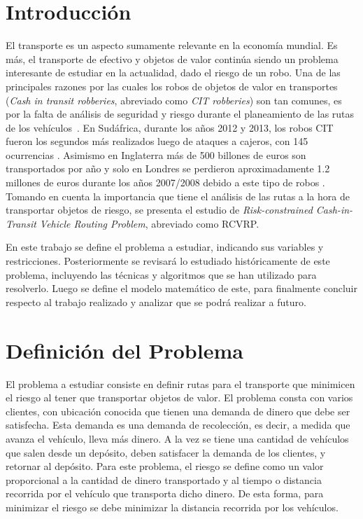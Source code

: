 \documentclass[letter, 10pt]{article}
\begin{document}
\section{Introducci\'on}
El transporte es un aspecto sumamente relevante en la economía mundial. Es más, el transporte de efectivo y objetos de valor continúa siendo un problema interesante de estudiar en la actualidad, dado el riesgo de un robo. Una de las principales razones por las cuales los robos de objetos de valor en transportes (\textit{Cash in transit robberies}, abreviado como \textit{CIT robberies}) son tan comunes, es por la falta de análisis de seguridad y riesgo durante el planeamiento de las rutas de los vehículos~\cite{hepenstal2010concentration}. En Sudáfrica, durante los años 2012 y 2013, los robos CIT fueron los segundos más realizados luego de ataques a cajeros, con 145 ocurrencias \cite{thobane2014criminal}. Asimismo en Inglaterra más de 500 billones de euros son transportados por año \cite{talarico2015metaheuristics} y solo en Londres se perdieron aproximadamente 1.2 millones de euros durante los años 2007/2008 debido a este tipo de robos \cite{hepenstal2010concentration}. Tomando en cuenta la importancia que tiene el análisis de las rutas a la hora de transportar objetos de riesgo, se presenta el estudio de \textit{Risk-constrained Cash-in-Transit Vehicle Routing Problem}, abreviado como RCVRP. 

En este trabajo se define el problema a estudiar, indicando sus variables y restricciones. Posteriormente se revisará lo estudiado históricamente de este problema, incluyendo las técnicas y algoritmos que se han utilizado para resolverlo. Luego se define el modelo matemático de este, para finalmente concluir respecto al trabajo realizado y analizar que se podrá realizar a futuro.

\section{Definici\'on del Problema}
El problema a estudiar consiste en definir rutas para el transporte que minimicen el riesgo al tener que transportar objetos de valor. El problema consta con varios clientes, con ubicación conocida que tienen una demanda de dinero que debe ser satisfecha. Esta demanda es una demanda de recolección, es decir, a medida que avanza el vehículo, lleva más dinero. A la vez se tiene una cantidad de vehículos que salen desde un depósito, deben satisfacer la demanda de los clientes, y retornar al depósito. Para este problema, el riesgo se define como un valor proporcional a la cantidad de dinero transportado y al tiempo o distancia recorrida por el vehículo que transporta dicho dinero. De esta forma, para minimizar el riesgo se debe minimizar la distancia recorrida por los vehículos.
\end{document}
